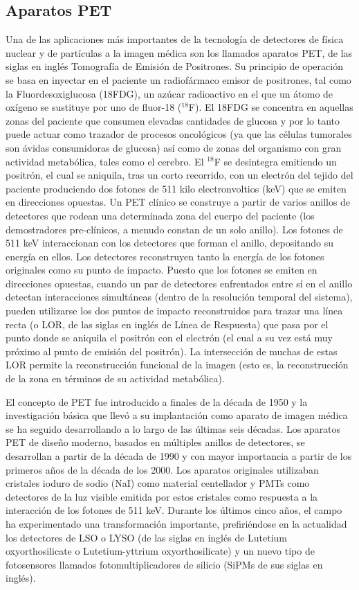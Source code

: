 
\subsection*{Aparatos PET}

   Una de las aplicaciones más importantes de la tecnología de detectores de física nuclear y de partículas a la imagen médica son los llamados aparatos PET, de las siglas en inglés Tomografía de Emisión de Positrones. Su principio de operación se basa en inyectar en el paciente un radiofármaco emisor de positrones, tal como la Fluordesoxiglucosa (18FDG), un azúcar radioactivo en el que un átomo de oxígeno se sustituye por uno de fluor-18 (\ensuremath{^{18}}F). El 18FDG se concentra en aquellas zonas del paciente que consumen elevadas cantidades de glucosa y por lo tanto puede actuar como trazador de procesos oncológicos (ya que las células tumorales son ávidas consumidoras de glucosa) así como de zonas del organismo con gran actividad metabólica, tales como el cerebro. El \ensuremath{^{18}}F se desintegra emitiendo un positrón, el cual se aniquila, tras un corto recorrido, con un electrón del tejido del paciente produciendo dos fotones de 511 kilo electronvoltios (keV) que se emiten en direcciones opuestas. Un PET clínico se construye a partir de varios anillos de detectores que rodean una determinada zona del cuerpo del paciente (los demostradores pre-clínicos, a menudo constan de un solo anillo). Los fotones de 511 keV interaccionan con los detectores que forman el anillo, depositando su energía en ellos. Los detectores reconstruyen tanto la energía de los fotones originales como su punto de impacto. Puesto que los fotones se emiten en direcciones opuestas, cuando un par de detectores enfrentados entre sí en el anillo detectan interacciones simultáneas (dentro de la resolución temporal del sistema), pueden utilizarse los dos puntos de impacto reconstruidos para trazar una línea recta (o LOR, de las siglas en inglés de Línea de Respuesta) que pasa por el punto donde se aniquila el positrón con el electrón (el cual a su vez está muy próximo al punto de emisión del positrón). La intersección de muchas de estas LOR permite la reconstrucción funcional de la imagen (esto es, la reconstrucción de la zona en términos de su actividad metabólica). 

El concepto de PET fue introducido a finales de la década de 1950 y la investigación básica que llevó a su implantación como aparato de imagen médica se ha seguido desarrollando a lo largo de las últimas seis décadas. Los aparatos PET de diseño moderno, basados en múltiples anillos de detectores, se desarrollan a partir de la década de 1990 y con mayor importancia a partir de los primeros años de la década de los 2000. Los aparatos originales utilizaban cristales ioduro de sodio (NaI) como material centellador y PMTs como detectores de la luz visible emitida por estos cristales como respuesta a la interacción de los fotones de 511 keV. Durante los últimos cinco años, el campo ha experimentado una transformación importante, prefiriéndose en la actualidad los detectores de LSO o LYSO (de las siglas en inglés de Lutetium oxyorthosilicate o Lutetium-yttrium oxyorthosilicate) y un nuevo tipo de fotosensores llamados fotomultiplicadores de silicio (SiPMs de sus siglas en inglés). 

